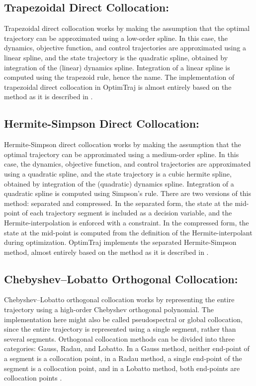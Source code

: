 \subsection{Trapezoidal Direct Collocation:  }

Trapezoidal direct collocation works by making the assumption that the optimal trajectory can be approximated using a low-order spline. In this case, the dynamics, objective function, and control trajectories are approximated using a linear spline, and the state trajectory is the quadratic spline, obtained by integration of the (linear) dynamics spline. Integration of a linear spline is computed using the trapezoid rule, hence the name. The implementation of trapezoidal direct collocation in OptimTraj is almost entirely based on the method as it is described in \cite{Betts2010}.

\subsection{Hermite-Simpson Direct Collocation:  }

Hermite-Simpson direct collocation works by making the assumption that the optimal trajectory can be approximated using a medium-order spline. In this case, the dynamics, objective function, and control trajectories are approximated using a quadratic spline, and the state trajectory is a cubic hermite spline, obtained by integration of the (quadratic) dynamics spline. Integration of a quadratic spline is computed using Simpson's rule. There are two versions of this method: separated and compressed. In the separated form, the state at the mid-point of each trajectory segment is included as a decision variable, and the Hermite-interpolation is enforced with a constraint. In the compressed form, the state at the mid-point is computed from the definition of the Hermite-interpolant during optimization. OptimTraj implements the separated Hermite-Simpson method, almost entirely based on the method as it is described in \cite{Betts2010}.

\subsection{Chebyshev--Lobatto Orthogonal Collocation:  }

Chebyshev--Lobatto orthogonal collocation works by representing the entire trajectory using a high-order Chebyshev orthogonal polynomial. The implementation here might also be called pseudospectral or global collocation, since the entire trajectory is represented using a single segment, rather than several segments. Orthogonal collocation methods can be divided into three categories: Gauss, Radau, and Lobatto. In a Gauss method, neither end-point of a segment is a collocation point, in a Radau method, a single end-point of the segment is a collocation point, and in a Lobatto method, both end-points are collocation points \cite{Garg2010}.

